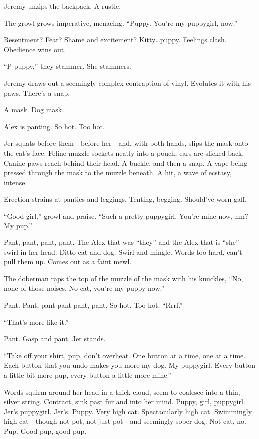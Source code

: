 Jeremy unzips the backpack. A rustle.

The growl grows imperative, menacing. ``Puppy. You're my puppygirl, now.''

Resentment? Fear? Shame and excitement? Kitty\ldots{}puppy. Feelings clash. Obedience wins out.

``P-puppy,'' they stammer. She stammers.

Jeremy draws out a seemingly complex contraption of vinyl. Evolutes it with his paws. There's a snap.

A mask. Dog mask.

Alex is panting. So hot. Too hot.

Jer squats before them---before her---and, with both hands, slips the mask onto the cat's face. Feline muzzle sockets neatly into a pouch, ears are slicked back. Canine paws reach behind their head. A buckle, and then a snap. A vape being pressed through the mask to the muzzle beneath. A hit, a wave of ecstasy, intense.

Erection strains at panties and leggings. Tenting, begging. Should've worn gaff.

``Good girl,'' growl and praise. ``Such a pretty puppygirl. You're mine now, hm? My pup.''

Pant, pant, pant, pant. The Alex that was ``they'' and the Alex that is ``she'' swirl in her head. Ditto cat and dog. Swirl and mingle. Words too hard, can't pull them up. Comes out as a faint mewl.

The doberman raps the top of the muzzle of the mask with his knuckles, ``No, none of those noises. No cat, you're my puppy now.''

Pant. Pant, pant pant pant, pant. So hot. Too hot. ``Rrrf.''

``That's more like it.''

Pant. Gasp and pant. Jer stands.

``Take off your shirt, pup, don't overheat. One button at a time, one at a time. Each button that you undo makes you more my dog. My puppygirl. Every button a little bit more pup, every button a little more mine.''

Words squirm around her head in a thick cloud, seem to coalesce into a thin, silver string. Contract, sink past fur and into her mind. Puppy, girl, puppygirl. Jer's puppygirl. Jer's. Puppy. Very high cat. Spectacularly high cat. Swimmingly high cat---though not pot, not just pot---and seemingly sober dog. Not cat, no. Pup. Good pup, good pup.

